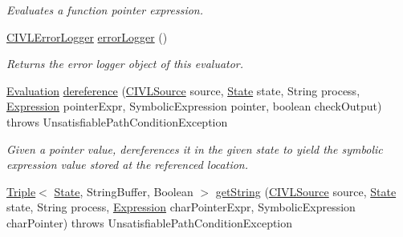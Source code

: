 \begin{DoxyCompactItemize}
\begin{DoxyCompactList}\small\item\em Evaluates a function pointer expression. \end{DoxyCompactList}\item 
\hyperlink{classedu_1_1udel_1_1cis_1_1vsl_1_1civl_1_1log_1_1IF_1_1CIVLErrorLogger}{C\+I\+V\+L\+Error\+Logger} \hyperlink{classedu_1_1udel_1_1cis_1_1vsl_1_1civl_1_1semantics_1_1common_1_1CommonEvaluator_a416c6bea70e96a33023cc3e99ec261c9}{error\+Logger} ()
\begin{DoxyCompactList}\small\item\em Returns the error logger object of this evaluator. \end{DoxyCompactList}\item 
\hyperlink{classedu_1_1udel_1_1cis_1_1vsl_1_1civl_1_1semantics_1_1IF_1_1Evaluation}{Evaluation} \hyperlink{classedu_1_1udel_1_1cis_1_1vsl_1_1civl_1_1semantics_1_1common_1_1CommonEvaluator_abfa659119a8261cff75d477519654c0f}{dereference} (\hyperlink{interfaceedu_1_1udel_1_1cis_1_1vsl_1_1civl_1_1model_1_1IF_1_1CIVLSource}{C\+I\+V\+L\+Source} source, \hyperlink{interfaceedu_1_1udel_1_1cis_1_1vsl_1_1civl_1_1state_1_1IF_1_1State}{State} state, String process, \hyperlink{interfaceedu_1_1udel_1_1cis_1_1vsl_1_1civl_1_1model_1_1IF_1_1expression_1_1Expression}{Expression} pointer\+Expr, Symbolic\+Expression pointer, boolean check\+Output)  throws Unsatisfiable\+Path\+Condition\+Exception 
\begin{DoxyCompactList}\small\item\em Given a pointer value, dereferences it in the given state to yield the symbolic expression value stored at the referenced location. \end{DoxyCompactList}\item 
\hyperlink{classedu_1_1udel_1_1cis_1_1vsl_1_1civl_1_1util_1_1IF_1_1Triple}{Triple}$<$ \hyperlink{interfaceedu_1_1udel_1_1cis_1_1vsl_1_1civl_1_1state_1_1IF_1_1State}{State}, String\+Buffer, Boolean $>$ \hyperlink{classedu_1_1udel_1_1cis_1_1vsl_1_1civl_1_1semantics_1_1common_1_1CommonEvaluator_a557e5590bf501419ec3f938fa4c0eabc}{get\+String} (\hyperlink{interfaceedu_1_1udel_1_1cis_1_1vsl_1_1civl_1_1model_1_1IF_1_1CIVLSource}{C\+I\+V\+L\+Source} source, \hyperlink{interfaceedu_1_1udel_1_1cis_1_1vsl_1_1civl_1_1state_1_1IF_1_1State}{State} state, String process, \hyperlink{interfaceedu_1_1udel_1_1cis_1_1vsl_1_1civl_1_1model_1_1IF_1_1expression_1_1Expression}{Expression} char\+Pointer\+Expr, Symbolic\+Expression char\+Pointer)  throws Unsatisfiable\+Path\+Condition\+Exception 

\end{DoxyCompactItemize}
